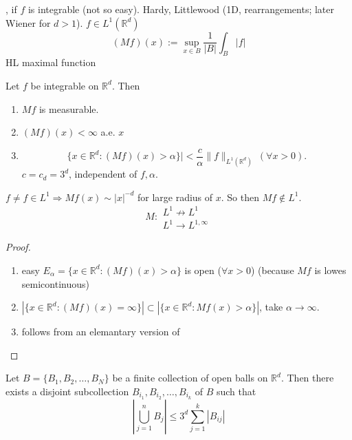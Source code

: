 , if $f$ is integrable (not so easy). Hardy, Littlewood (1D, rearrangements; later Wiener for $d>1$). $f∈L^1(ℝ^d)$
\begin{equation*}
	(Mf)(x):=\sup_{x∈B}\frac1{|B|}∫_B|f|
\end{equation*}
 HL maximal function
\begin{theo}
	Let $f$ be integrable on $ℝ^d$. Then
	\begin{enumerate}
		\item $Mf$ is measurable.
		\item $(Mf)(x)<∞$ a.e. $x$
		\item 
			\begin{equation} 
				\{x∈ℝ^d:(Mf)(x)>α\}|<\frac cα\|f\|_{L^1(ℝ^d)}\ (∀x>0)\label{eq:maxweak}.
			\end{equation} $c=c_d=3^d$, independent of $f,α$.
	\end{enumerate}
\end{theo}
$f\neq f∈L^1 ⇒Mf(x)\sim|x|^{-d}$ for large radius of $x$. So then $Mf\not\in L^1$.
\begin{equation*}
	M:
	\begin{matrix}
		L^1\not\to L^1\\
		L^1→L^{1,∞}
	\end{matrix}
\end{equation*}
\begin{proof}
	\begin{enumerate}
		\item easy $E_α=\{x∈ℝ^d:(Mf)(x)>α\}$ is open ($∀x>0$) (because $Mf$ is lowes semicontinuous)
		\item $|\{x∈ℝ^d: (Mf)(x)=∞\}|⊂|\{x∈ℝ^d:Mf(x)>α\}|$, take $α→∞$.
		\item follows from an elemantary version of 
	\end{enumerate}
\end{proof}%
\begin{lem}
	Let $B=\{B_1,B_2,\ldots, B_N\}$ be a finite collection of open balls on $ℝ^d$. Then there exists a disjoint subcollection $B_{i_1},B_{i_2},\ldots,B_{i_k}$ of $B$ such that
	\begin{equation*}
		|\bigcup_{j=1}^nB_j|\leq3^d\sum_{j=1}^k|B_{ij}|
	\end{equation*}
\end{lem}
